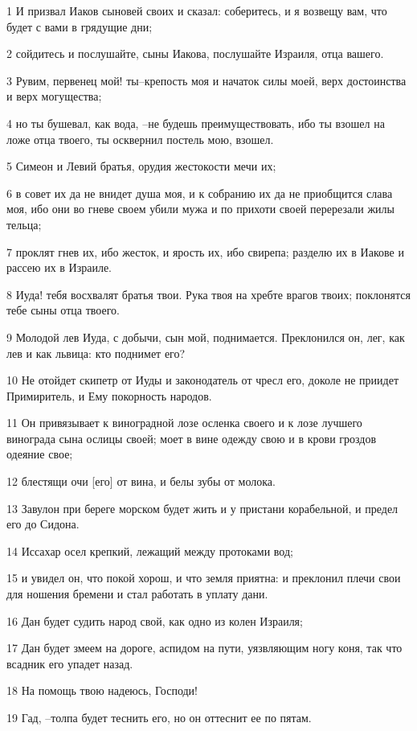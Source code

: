 \par 1 И призвал Иаков сыновей своих и сказал: соберитесь, и я возвещу вам, что будет с вами в грядущие дни;
\par 2 сойдитесь и послушайте, сыны Иакова, послушайте Израиля, отца вашего.
\par 3 Рувим, первенец мой! ты--крепость моя и начаток силы моей, верх достоинства и верх могущества;
\par 4 но ты бушевал, как вода, --не будешь преимуществовать, ибо ты взошел на ложе отца твоего, ты осквернил постель мою, взошел.
\par 5 Симеон и Левий братья, орудия жестокости мечи их;
\par 6 в совет их да не внидет душа моя, и к собранию их да не приобщится слава моя, ибо они во гневе своем убили мужа и по прихоти своей перерезали жилы тельца;
\par 7 проклят гнев их, ибо жесток, и ярость их, ибо свирепа; разделю их в Иакове и рассею их в Израиле.
\par 8 Иуда! тебя восхвалят братья твои. Рука твоя на хребте врагов твоих; поклонятся тебе сыны отца твоего.
\par 9 Молодой лев Иуда, с добычи, сын мой, поднимается. Преклонился он, лег, как лев и как львица: кто поднимет его?
\par 10 Не отойдет скипетр от Иуды и законодатель от чресл его, доколе не приидет Примиритель, и Ему покорность народов.
\par 11 Он привязывает к виноградной лозе осленка своего и к лозе лучшего винограда сына ослицы своей; моет в вине одежду свою и в крови гроздов одеяние свое;
\par 12 блестящи очи [его] от вина, и белы зубы от молока.
\par 13 Завулон при береге морском будет жить и у пристани корабельной, и предел его до Сидона.
\par 14 Иссахар осел крепкий, лежащий между протоками вод;
\par 15 и увидел он, что покой хорош, и что земля приятна: и преклонил плечи свои для ношения бремени и стал работать в уплату дани.
\par 16 Дан будет судить народ свой, как одно из колен Израиля;
\par 17 Дан будет змеем на дороге, аспидом на пути, уязвляющим ногу коня, так что всадник его упадет назад.
\par 18 На помощь твою надеюсь, Господи!
\par 19 Гад, --толпа будет теснить его, но он оттеснит ее по пятам.
